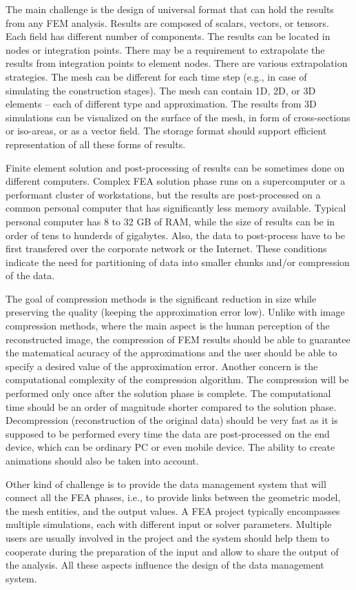 The main challenge is the design of universal format that can hold the results from any FEM analysis. Results are composed of scalars, vectors, or tensors. Each field has different number of components. The results can be located in nodes or integration points. There may be a requirement to extrapolate the results from integration points to element nodes. There are various extrapolation strategies. The mesh can be different for each time step (e.g., in case of simulating the construction stages). The mesh can contain 1D, 2D, or 3D elements -- each of different type and approximation. The results from 3D simulations can be visualized on the surface of the mesh, in form of cross-sections or iso-areas, or as a vector field. The storage format should support efficient representation of all these forms of results.

Finite element solution and post-processing of results can be sometimes done on different computers. Complex FEA solution phase runs on a supercomputer or a performant cluster of workstations, but the results are post-processed on a common personal computer that has significantly less memory available. Typical personal computer has 8 to 32 GB of RAM, while the size of results can be in order of tens to hunderds of gigabytes. Also, the data to post-process have to be first transfered over the corporate network or the Internet. These conditions indicate the need for partitioning of data into smaller chunks and/or compression of the data.

The goal of compression methods is the significant reduction in size while preserving the quality (keeping the approximation error low). Unlike with image compression methods, where the main aspect is the human perception of the reconstructed image, the compression of FEM results should be able to guarantee the matematical acuracy of the approximations and the user should be able to specify a desired value of the approximation error. Another concern is the computational complexity of the compression algorithm. The compression will be performed only once after the solution phase is complete. The computational time should be an order of magnitude shorter compared to the solution phase. Decompression (reconstruction of the original data) should be very fast as it is supposed to be performed every time the data are post-processed on the end device, which can be ordinary PC or even mobile device. The ability to create animations should also be taken into account.

Other kind of challenge is to provide the data management system that will connect all the FEA phases, i.e., to provide links between the geometric model, the mesh entities, and the output values. A FEA project typically encompasses multiple simulations, each with different input or solver parameters. Multiple users are usually involved in the project and the system should help them to cooperate during the preparation of the input and allow to share the output of the analysis. All these aspects influence the design of the data management system.